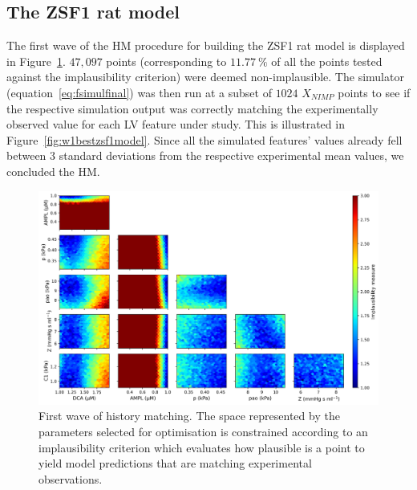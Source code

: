 \subsection{The ZSF1 rat model}\label{sec:buildingzsf1model}
The first wave of the HM procedure for building the ZSF1 rat model is displayed in Figure~\ref{fig:w1zsf1rat}. $47,097$ points (corresponding to $\SI{11.77}{\percent}$ of all the points tested against the implausibility criterion) were deemed non-implausible. The simulator (equation~\eqref{eq:fsimulfinal}) was then run at a subset of $1024$ $X_{NIMP}$ points to see if the respective simulation output was correctly matching the experimentally observed value for each LV feature under study. This is illustrated in Figure~\ref{fig:w1bestzsf1model}. Since all the simulated features' values already fell between $3$ standard deviations from the respective experimental mean values, we concluded the HM.

\begin{figure}[!ht]
    \myfloatalign
    \includegraphics[width=\textwidth]{figures/chapter07/wave_1.png}
    \caption{First wave of history matching. The space represented by the parameters selected for optimisation is constrained according to an implausibility criterion which evaluates how plausible is a point to yield model predictions that are matching experimental observations.}  
    \label{fig:w1zsf1rat}
\end{figure}

